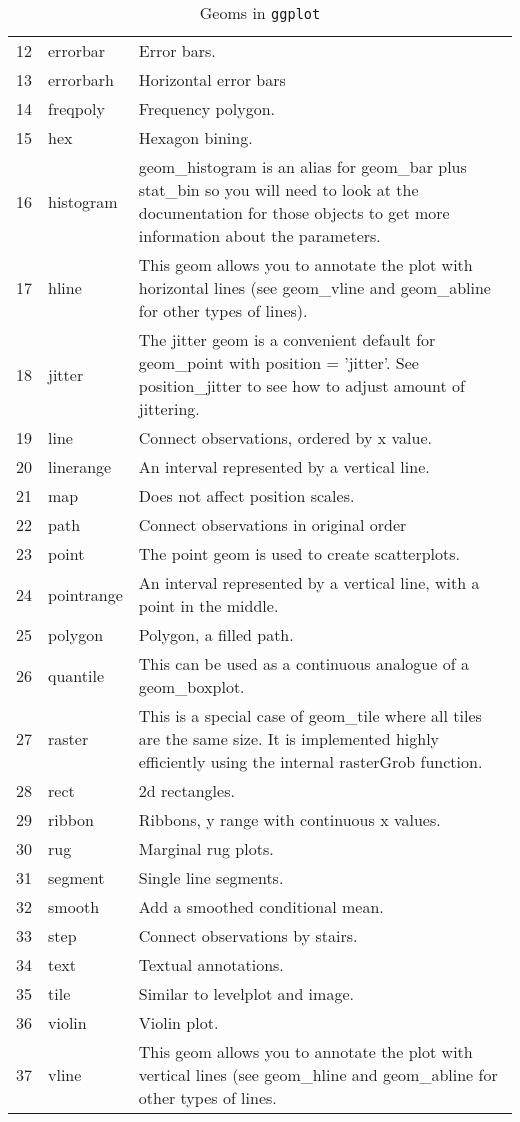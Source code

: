 \begin{table}[ht]
\begin{tabular}{rll}
  12 & errorbar & Error bars. \\ 
  13 & errorbarh & Horizontal error bars \\ 
  14 & freqpoly & Frequency polygon. \\ 
  15 & hex & Hexagon bining. \\ 
  16 & histogram & geom\_histogram is an alias for geom\_bar plus stat\_bin so you will need to look at the documentation for those objects to get more information about the parameters. \\ 
  17 & hline & This geom allows you to annotate the plot with horizontal lines (see geom\_vline and geom\_abline for other types of lines). \\ 
  18 & jitter & The jitter geom is a convenient default for geom\_point with position = 'jitter'. See position\_jitter to see how to adjust amount of jittering. \\ 
  19 & line & Connect observations, ordered by x value. \\ 
  20 & linerange & An interval represented by a vertical line. \\ 
  21 & map & Does not affect position scales. \\ 
  22 & path & Connect observations in original order \\ 
  23 & point & The point geom is used to create scatterplots. \\ 
  24 & pointrange & An interval represented by a vertical line, with a point in the middle. \\ 
  25 & polygon & Polygon, a filled path. \\ 
  26 & quantile & This can be used as a continuous analogue of a geom\_boxplot. \\ 
  27 & raster & This is a special case of geom\_tile where all tiles are the same size. It is implemented highly efficiently using the internal rasterGrob function. \\ 
  28 & rect & 2d rectangles. \\ 
  29 & ribbon & Ribbons, y range with continuous x values. \\ 
  30 & rug & Marginal rug plots. \\ 
  31 & segment & Single line segments. \\ 
  32 & smooth & Add a smoothed conditional mean. \\ 
  33 & step & Connect observations by stairs. \\ 
  34 & text & Textual annotations. \\ 
  35 & tile & Similar to levelplot and image. \\ 
  36 & violin & Violin plot. \\ 
  37 & vline & This geom allows you to annotate the plot with vertical lines (see geom\_hline and geom\_abline for other types of lines. \\ 
   \hline
\end{tabular}
\caption{Geoms in \texttt{ggplot}} 
\label{geoms}
\end{table}
